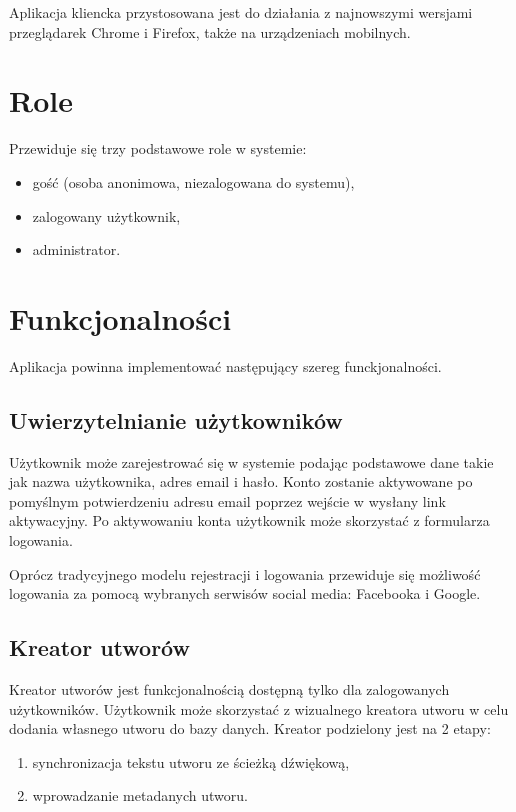 \documentclass[11pt]{article}
\begin{document}
  Aplikacja kliencka przystosowana jest do działania z najnowszymi wersjami przeglądarek Chrome i Firefox, także na urządzeniach mobilnych.

  \section{Role}
  Przewiduje się trzy podstawowe role w systemie:

  \begin{itemize}
    \item gość (osoba anonimowa, niezalogowana do systemu),
    \item zalogowany użytkownik,
    \item administrator.
  \end{itemize}

  \section{Funkcjonalności}
  Aplikacja powinna implementować następujący szereg funckjonalności.

  \subsection{Uwierzytelnianie użytkowników}
  Użytkownik może zarejestrować się w systemie podając podstawowe dane takie jak nazwa użytkownika, adres email i hasło. Konto zostanie aktywowane po pomyślnym potwierdzeniu adresu email poprzez wejście w wysłany link aktywacyjny. Po aktywowaniu konta użytkownik może skorzystać z formularza logowania.

  Oprócz tradycyjnego modelu rejestracji i logowania przewiduje się możliwość logowania za pomocą wybranych serwisów social media: Facebooka i Google.

  \subsection{Kreator utworów}
  Kreator utworów jest funkcjonalnością dostępną tylko dla zalogowanych użytkowników. Użytkownik może skorzystać z wizualnego kreatora utworu w celu dodania własnego utworu do bazy danych. Kreator podzielony jest na 2 etapy:

  \begin{enumerate}
    \item synchronizacja tekstu utworu ze ścieżką dźwiękową,
    \item wprowadzanie metadanych utworu.
  \end{enumerate}
\end{document}
